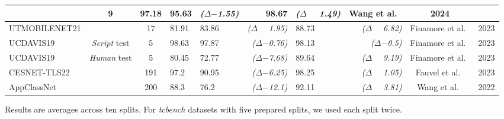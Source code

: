 \documentclass[lettersize,journal,twoside,article]{IEEEtran}
\begin{document}
\begin{table}[!ht]
\begin{threeparttable}
\begin{NiceTabular}{|l|c|c|l|lr|lr|c|c|}
& 
9&
97.18\tnote{$\dag$} &
 95.63 &
 \textit{($\Delta$\:$-$1.55)}   &
 98.67 &
 \textit{($\Delta$\,\,~~1.49)} &
Wang et al.~\cite{wang2024augmentation}        &
2024  \\ \hline
UTMOBILENET21 &
&
17&
81.91\tnote{$\dag$} & 
 83.86 & 
 \textit{($\Delta$\,\,~~1.95)} & 
 88.73 & 
 \textit{($\Delta$\,\,~~6.82)} &  
Finamore et al.~\cite{finamore2023replication} & 
2023 \\ \hline
UCDAVIS19&
\textit{Script} test& 
5&
98.63 & 
 97.87 & 
 \textit{($\Delta$\:$-$0.76)} & 
 98.13 & 
 \textit{($\Delta$\:\:\:$-$0.5)} & 
Finamore et al.~\cite{finamore2023replication} & 
2023 \\ \hline
UCDAVIS19 &
\textit{Human} test&
5&
80.45 &
 72.77 &
 \textit{($\Delta$\:$-$7.68)}  &
 89.64 &
 \textit{($\Delta$\,\,~~9.19)} &
Finamore et al.~\cite{finamore2023replication} &
2023 \\ \hline
CESNET-TLS22  &
& 
191&
97.2        &
 90.95 &
 \textit{($\Delta$\:$-$6.25)}   &
 98.25 &
 \textit{($\Delta$\,\,~~1.05)} &
Fauvel et al.~\cite{fauvel2023lightweight}     &
2023 \\ \hline 
AppClassNet  &
& 
200&
88.3        &
 76.2 &
 \textit{($\Delta$\:$-$12.1)}   &
 92.11 &
 \textit{($\Delta$\,\,~~3.81)} &
Wang et al.~\cite{dataset_AppClassNet}  &
2022 \\ \hline 
\end{NiceTabular}

\begin{tablenotes}
\leftskip=0.8cm

\item Results are averages across ten splits. For \textit{tcbench} datasets with five prepared splits, we used each split twice.


\end{tablenotes}
\end{threeparttable}
\end{table}
\end{document}
